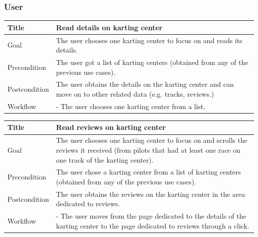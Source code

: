 \documentclass{beamer}
\begin{document}
\begin{frame}
    \frametitle{User}
    \begin{table}
        \tiny
        \begin{tabular}{|p{2cm}|p{6cm}|}
        \hline
        Title & \textbf{Read details on karting center} \\
        \hline
        Goal & The user chooses one karting center to focus on and reads its details. \\
        \hline
        Precondition & The user got a list of karting centers (obtained from any of the previous use cases). \\
        \hline
        Postcondition & The user obtains the details on the karting center and can move on to other related data (e.g. tracks, reviews.)\\
        \hline
        Workflow &
        - The user chooses one karting center from a list. \\
        \hline
        \end{tabular}
\end{table}

\begin{table}
    \tiny
    \begin{tabular}{|p{2cm}|p{6cm}|}
    \hline
    Title & \textbf{Read reviews on karting center} \\
    \hline
    Goal & The user chooses one karting center to focus on and scrolls the reviews it received (from pilots
    that had at least one race on one track of the karting center). \\
    \hline
    Precondition & The user chose a karting center from a list of karting centers (obtained from any of the previous use cases).\\
    \hline
    Postcondition & The user obtains the reviews on the karting center in the area dedicated to reviews. \\
    \hline
    Workflow &
    - The user moves from the page dedicated to the details of the karting center to the
    page dedicated to reviews through a click. \\
    \hline
    \end{tabular}
\end{table}
\end{frame}


\end{document}
